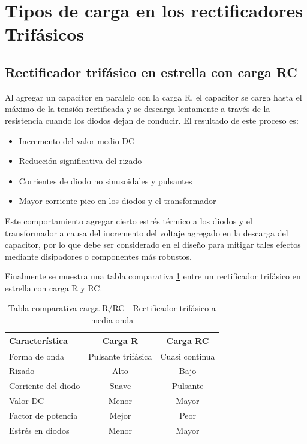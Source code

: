 \section{Tipos de carga en los rectificadores Trifásicos}

\subsection{Rectificador trifásico en estrella con carga RC}

Al agregar un capacitor en paralelo con la carga R, el capacitor se carga hasta el máximo de la tensión rectificada y se descarga lentamente a través de la resistencia cuando los diodos dejan de conducir. El resultado de este proceso es:

\begin{itemize}
	\item Incremento del valor medio DC
	\item Reducción significativa del rizado
	\item Corrientes de diodo no sinusoidales y pulsantes
	\item Mayor corriente pico en los diodos y el transformador
\end{itemize}

Este comportamiento agregar cierto estrés térmico a los diodos y el transformador a causa del incremento del voltaje agregado en la descarga del capacitor, por lo que debe ser considerado en el diseño para mitigar tales efectos mediante disipadores o componentes más robustos.

Finalmente se muestra una tabla comparativa \ref{tab:carga-R-RC} entre un rectificador trifásico en estrella con carga R y RC. 

\begin{table}[htbp]
	\centering
	\begin{tabular}{lcc}
		\toprule
		Característica & Carga R & Carga RC \\
		\midrule
		Forma de onda & Pulsante trifásica & Cuasi continua \\
		Rizado & Alto & Bajo \\
		Corriente del diodo & Suave & Pulsante \\
		Valor DC & Menor & Mayor \\
		Factor de potencia & Mejor & Peor \\
		Estrés en diodos & Menor & Mayor \\
		\bottomrule
	\end{tabular}
	\caption{Tabla comparativa carga R/RC - Rectificador trifásico a media onda}
	\label{tab:carga-R-RC}
\end{table}


